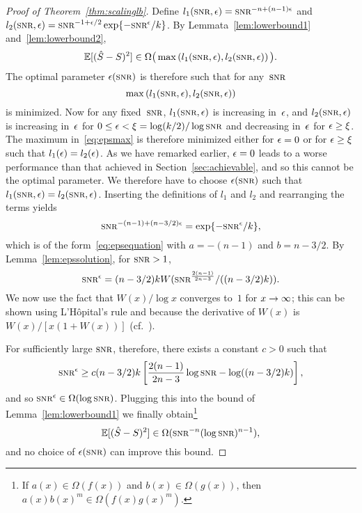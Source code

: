 %
\begin{proof}[Proof of Theorem~\ref{thm:scalinglb}]
  Define $l_1(\snr, \e) = \snr^{-n+(n-1)\e}$ and $l_2(\snr,\e) = \snr^{-1+\e/2}
  \exp\{-\snr^\e/k\}$. By Lemmata~\ref{lem:lowerbound1}
  and~\ref{lem:lowerbound2},
  \begin{equation*}
    \mse \in \Omega\big(\max \left( l_1(\snr,\e), l_2(\snr,\e) \right) \big).
  \end{equation*}
  The optimal parameter $\e(\snr)$ is therefore such that for
  any~$\snr$
  \begin{equation}
    \label{eq:epsmax}
    \max\left( l_1(\snr,\e), l_2(\snr,\e) \right)
  \end{equation}
  is minimized. Now for any fixed~$\snr$, $l_1(\snr,\e)$ is increasing in~$\epsilon$,
  and $l_2(\snr,\e)$ is increasing in~$\epsilon$ for $0 \le \e < \xi =
  \log(k/2)/\log\snr$ and decreasing in~$\epsilon$ for $\epsilon \ge \xi$.
  The maximum
  in~\eqref{eq:epsmax} is therefore minimized either for $\epsilon = 0$ or for $\epsilon \ge
  \xi$
  such that $l_1(\epsilon) = l_2(\epsilon)$. As we have remarked earlier, $\epsilon = 0$ leads to
  a worse performance than that achieved in Section~\ref{sec:achievable}, and so
  this cannot be the optimal parameter. We therefore have to choose
  $\e(\snr)$ such that $l_1(\snr,\e) = l_2(\snr, \e)$.  Inserting the
  definitions of $l_1$ and $l_2$ and rearranging the terms yields
  \begin{equation*}
    \snr^{-(n-1) + (n-3/2)\e} = \exp\{-\snr^\e/k\},
  \end{equation*}
  which is of the form~\eqref{eq:epsequation} with $a = -(n-1)$ and $b = n-3/2$.
  By Lemma~\ref{lem:epssolution}, for $\snr > 1$,
  \begin{equation*}
    \snr^\e = (n-3/2)k W(\snr^{\frac{2(n-1)}{2n-3}} / ((n-3/2)k)).
  \end{equation*}
  We now use the fact that $W(x)/\log x$ converges to~$1$ for $x \rightarrow \infty$;
  this can be shown using L'H\^opital's rule and because the derivative of
  $W(x)$ is $W(x)/[x(1 + W(x))]$ (cf.~\cite{CorlessGHJK1996}).

  For sufficiently large $\snr$, therefore, there exists a constant $c > 0$ such
  that
  \begin{equation*}
    \snr^\e \ge c(n-3/2)k \left[ \frac{2(n-1)}{2n-3}\log\snr - \log((n-3/2)k)
    \right],
  \end{equation*}
  and so $\snr^\e \in \Omega(\log\snr)$. Plugging this into the bound of
  Lemma~\ref{lem:lowerbound1} we finally obtain\footnote{If $a(x) \in
  \Omega(f(x))$ and $b(x) \in \Omega(g(x))$, then $a(x)b(x)^m \in
  \Omega(f(x)g(x)^m)$.}
  \begin{equation*}
    \mse \in \Omega(\snr^{-n}(\log\snr)^{n-1}),
  \end{equation*}
  and no choice of $\e(\snr)$ can improve this bound.
\end{proof}


